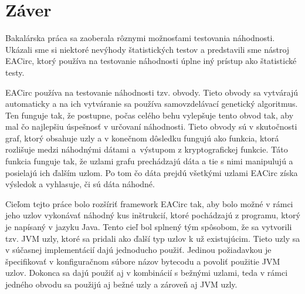 \chapter*{Záver}
\label{chap:conclusion}

Bakalárska práca sa zaoberala rôznymi možnosťami testovania náhodnosti. Ukázali sme si niektoré nevýhody štatistických testov a predstavili sme nástroj EACirc, ktorý používa na testovanie náhodnosti úplne iný prístup ako štatistické testy. 

EACirc používa na testovanie náhodnosti tzv. obvody. Tieto obvody sa vytvárajú automaticky a na ich vytváranie sa používa samovzdelávací genetický algoritmus. Ten funguje tak, že postupne, počas celého behu vylepšuje tento obvod tak, aby mal čo najlepšiu úspešnosť v určovaní náhodnosti. Tieto obvody sú v skutočnosti graf, ktorý obsahuje uzly a v konečnom dôsledku fungujú ako funkcia, ktorá rozlišuje medzi náhodnými dátami a~výstupom z kryptografickej funkcie. Táto funkcia funguje tak, že uzlami grafu prechádzajú dáta a tie s nimi manipulujú a posielajú ich ďalším uzlom. Po tom čo dáta prejdú všetkými uzlami EACirc získa výsledok a vyhlasuje, či sú dáta náhodné.

Cieľom tejto práce bolo rozšíriť framework EACirc tak, aby bolo možné v rámci jeho uzlov vykonávať náhodný kus inštrukcií, ktoré pochádzajú z programu, ktorý je napísaný v jazyku Java. Tento cieľ bol splnený tým spôsobom, že sa vytvorili tzv. JVM uzly, ktoré sa pridali ako ďalší typ uzlov k už existujúcim. Tieto uzly sa v súčasnej implementácií dajú jednoducho použiť. Jedinou požiadavkou je špecifikovať v konfiguračnom súbore názov bytecodu a povoliť použitie JVM uzlov. Dokonca sa dajú použiť aj v kombinácií s bežnými uzlami, teda v rámci jedného obvodu sa použijú aj bežné uzly a zároveň aj JVM uzly.

